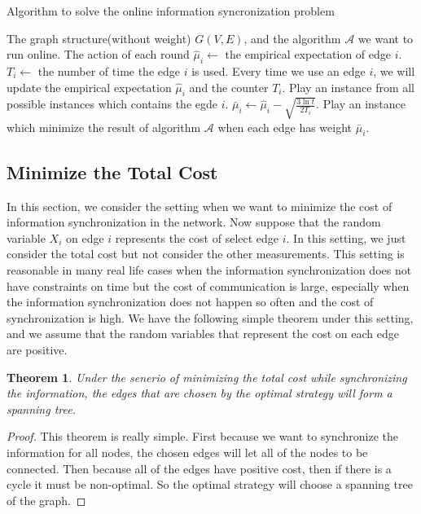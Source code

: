 \documentclass{article}
\theoremstyle{plain}
\newtheorem{thm}{Theorem}[section]
\theoremstyle{definition}
\theoremstyle{remark}
\begin{document}
    \begin{algorithm}
        \caption{Algorithm to solve the online information syncronization problem}
        \label{cucb}
        \begin{algorithmic}[1]
        \Require The graph structure(without weight) $G(V,E)$, and the algorithm $\mathcal A$ we want to run online.
        \Ensure The action of each round
            \State $\hat \mu_i \leftarrow$ the empirical expectation of edge $i$.
            \State $T_i \leftarrow$ the number of time the edge $i$ is used.
            \State Every time we use an edge $i$, we will update the empirical expectation $\hat \mu_i$ and the counter $T_i$.
                \State Play an instance from all possible instances which contains the egde $i$.
            \EndFor
                \State $\bar\mu_i \leftarrow \hat\mu_i - \sqrt{\frac{3\ln t}{2T_i}}$.
                \State Play an instance which minimize the result of algorithm $\mathcal A$ when each edge has weight $\bar\mu_i$.
            \EndFor
        \EndProcedure
        \end{algorithmic}
    \end{algorithm}

    \subsection{Minimize the Total Cost}
    In this section, we consider the setting when we want to minimize the cost of information synchronization in the network. Now suppose that the random variable $X_i$ on edge $i$ represents the cost of select edge $i$. In this setting, we just consider the total cost but not consider the other measurements. This setting is reasonable in many real life cases when the information synchronization does not have constraints on time but the cost of communication is large, especially when the information synchronization does not happen so often and the cost of synchronization is high. We have the following simple theorem under this setting, and we assume that the random variables that represent the cost on each edge are positive.\\

    \begin{thm}\label{min-spanning-tree}
        Under the senerio of minimizing the total cost while synchronizing the information, the edges that are chosen by the optimal strategy will form a spanning tree.
    \end{thm}
    \begin{proof}
        This theorem is really simple. First because we want to synchronize the information for all nodes, the chosen edges will let all of the nodes to be connected. Then because all of the edges have positive cost, then if there is a cycle it must be non-optimal. So the optimal strategy will choose a spanning tree of the graph.
    \end{proof}
\end{document}
